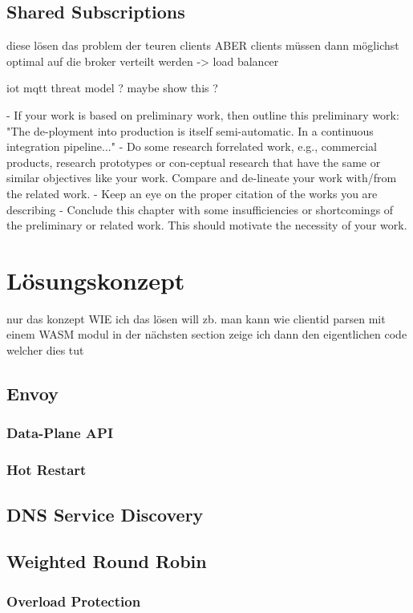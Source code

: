 \subsection{Shared Subscriptions}
diese lösen das problem der teuren clients ABER clients müssen dann möglichst optimal auf die broker verteilt werden
-> load balancer

iot mqtt threat model ? maybe show this ?

- If your work is based on preliminary work, then outline this preliminary work: "The de-ployment into production is itself semi-automatic. In a continuous integration pipeline..."
- Do some research forrelated work, e.g., commercial products, research prototypes or con-ceptual research that have the same or similar objectives like your work. Compare and de-lineate your work with/from the related work.
- Keep an eye on the proper citation of the works you are describing
- Conclude this chapter with some insufficiencies or shortcomings of the preliminary or related work. This should motivate the necessity of your work.

\section{Lösungskonzept}
nur das konzept WIE ich das lösen will zb. man kann wie clientid parsen mit einem WASM modul
in der nächsten section zeige ich dann den eigentlichen code welcher dies tut

\subsection{Envoy}
\subsubsection{Data-Plane API}
\subsubsection{Hot Restart}

\subsection{DNS Service Discovery}

\subsection{Weighted Round Robin}
\subsubsection{Overload Protection}
